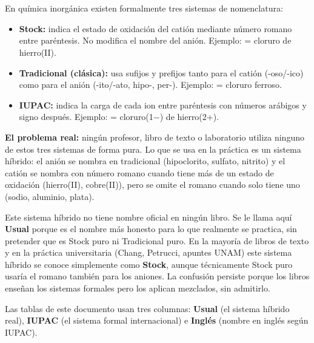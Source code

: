 \setlength{\tabcolsep}{4pt}
\renewcommand{\arraystretch}{1.3}

{}
\section*{\centering\fontsize{12}{18}}

En química inorgánica existen formalmente tres sistemas de nomenclatura:

\begin{itemize}
  \item \textbf{Stock:} indica el estado de oxidación del catión mediante número romano entre paréntesis. No modifica el nombre del anión. Ejemplo:  = cloruro de hierro(II).
  \item \textbf{Tradicional (clásica):} usa sufijos y prefijos tanto para el catión (-oso/-ico) como para el anión (-ito/-ato, hipo-, per-). Ejemplo:  = cloruro ferroso.
  \item \textbf{IUPAC:} indica la carga de cada ion entre paréntesis con números arábigos y signo después. Ejemplo:  = cloruro(1$-$) de hierro(2+).
\end{itemize}

\textbf{El problema real:} ningún profesor, libro de texto o laboratorio utiliza ninguno de estos tres sistemas de forma pura. Lo que se usa en la práctica es un sistema híbrido: el anión se nombra en tradicional (hipoclorito, sulfato, nitrito) y el catión se nombra con número romano cuando tiene más de un estado de oxidación (hierro(II), cobre(II)), pero se omite el romano cuando solo tiene uno (sodio, aluminio, plata).

Este sistema híbrido no tiene nombre oficial en ningún libro. Se le llama aquí \textbf{Usual} porque es el nombre más honesto para lo que realmente se practica, sin pretender que es Stock puro ni Tradicional puro. En la mayoría de libros de texto y en la práctica universitaria (Chang, Petrucci, apuntes UNAM) este sistema híbrido se conoce simplemente como \textbf{Stock}, aunque técnicamente Stock puro usaría el romano también para los aniones. La confusión persiste porque los libros enseñan los sistemas formales pero los aplican mezclados, sin admitirlo.

Las tablas de este documento usan tres columnas: \textbf{Usual} (el sistema híbrido real), \textbf{IUPAC} (el sistema formal internacional) e \textbf{Inglés} (nombre en inglés según IUPAC).

